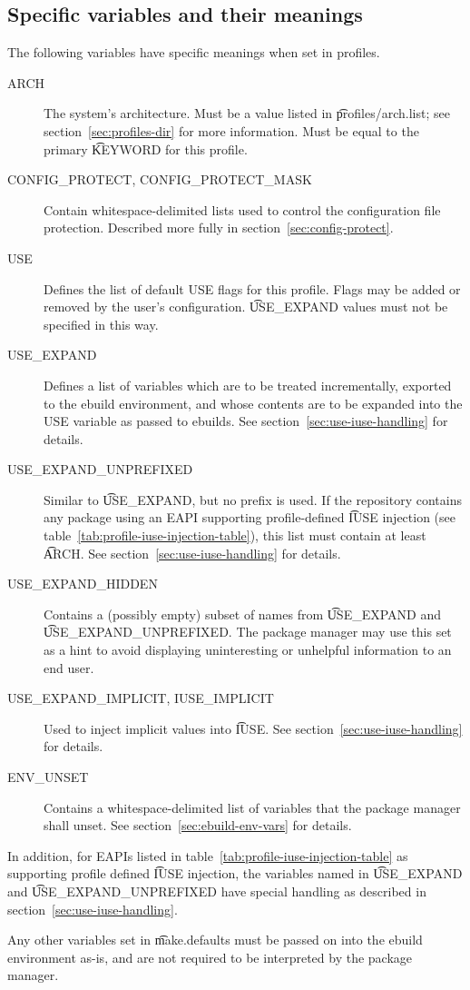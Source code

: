 \subsection{Specific variables and their meanings}
The following variables have specific meanings when set in profiles.
\begin{description}
\item[ARCH] The system's architecture. Must be a value listed in \t{profiles/arch.list}; see
    section~\ref{sec:profiles-dir} for more information. Must be equal to the primary \t{KEYWORD}
    for this profile.
\item[CONFIG_PROTECT, CONFIG_PROTECT_MASK] Contain whitespace-delimited lists used to control the
    configuration file protection. Described more fully in section~\ref{sec:config-protect}.
\item[USE] Defines the list of default USE flags for this profile. Flags may be added or removed by
    the user's configuration. \t{USE_EXPAND} values must not be specified in this way.
\item[USE_EXPAND] Defines a list of variables which are to be treated incrementally, exported to
    the ebuild environment, and whose contents are to be expanded into the USE variable as passed
    to ebuilds. See section~\ref{sec:use-iuse-handling} for details.
\item[USE_EXPAND_UNPREFIXED] Similar to \t{USE_EXPAND}, but no prefix is used. If the repository
    contains any package using an EAPI supporting profile-defined \t{IUSE} injection (see
    table~\ref{tab:profile-iuse-injection-table}), this list must contain at least \t{ARCH}\@.
    See section~\ref{sec:use-iuse-handling} for details.
\item[USE_EXPAND_HIDDEN] Contains a (possibly empty) subset of names from \t{USE_EXPAND} and
    \t{USE_EXPAND_UNPREFIXED}\@. The package manager may use this set as a hint to avoid
    displaying uninteresting or unhelpful information to an end user.
\item[USE_EXPAND_IMPLICIT, IUSE_IMPLICIT] Used to inject implicit values into \t{IUSE}\@. See
    section~\ref{sec:use-iuse-handling} for details.
\item[ENV_UNSET] Contains a whitespace-delimited list of variables that the package manager shall
    unset. See section~\ref{sec:ebuild-env-vars} for details.
\end{description}

In addition, for EAPIs listed in table~\ref{tab:profile-iuse-injection-table} as supporting profile
defined \t{IUSE} injection, the variables named in \t{USE_EXPAND} and \t{USE_EXPAND_UNPREFIXED}
have special handling as described in section~\ref{sec:use-iuse-handling}.

Any other variables set in \t{make.defaults} must be passed on into the ebuild environment as-is,
and are not required to be interpreted by the package manager.


